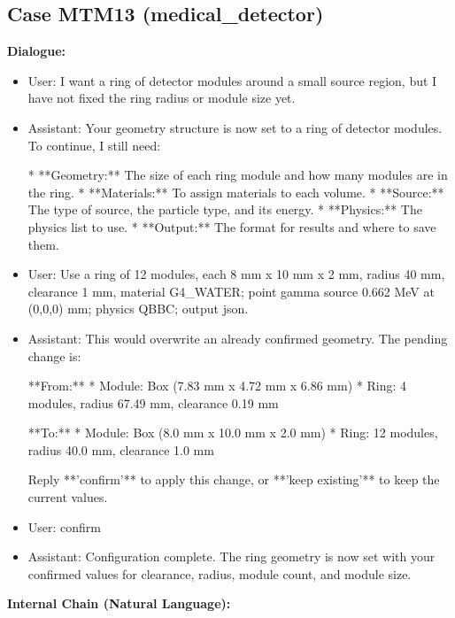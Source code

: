 \documentclass[11pt]{ctexart}
\begin{document}
\subsection{Case MTM13 (medical\_detector)}
\textbf{Dialogue:}
\begin{itemize}
\item User: I want a ring of detector modules around a small source region, but I have not fixed the ring radius or module size yet.
\item Assistant: Your geometry structure is now set to a ring of detector modules. To continue, I still need:

*   **Geometry:** The size of each ring module and how many modules are in the ring.
*   **Materials:** To assign materials to each volume.
*   **Source:** The type of source, the particle type, and its energy.
*   **Physics:** The physics list to use.
*   **Output:** The format for results and where to save them.
\item User: Use a ring of 12 modules, each 8 mm x 10 mm x 2 mm, radius 40 mm, clearance 1 mm, material G4\_WATER; point gamma source 0.662 MeV at (0,0,0) mm; physics QBBC; output json.
\item Assistant: This would overwrite an already confirmed geometry. The pending change is:

**From:**
*   Module: Box (7.83 mm x 4.72 mm x 6.86 mm)
*   Ring: 4 modules, radius 67.49 mm, clearance 0.19 mm

**To:**
*   Module: Box (8.0 mm x 10.0 mm x 2.0 mm)
*   Ring: 12 modules, radius 40.0 mm, clearance 1.0 mm

Reply **'confirm'** to apply this change, or **'keep existing'** to keep the current values.
\item User: confirm
\item Assistant: Configuration complete. The ring geometry is now set with your confirmed values for clearance, radius, module count, and module size.
\end{itemize}
\textbf{Internal Chain (Natural Language):}
\end{document}
